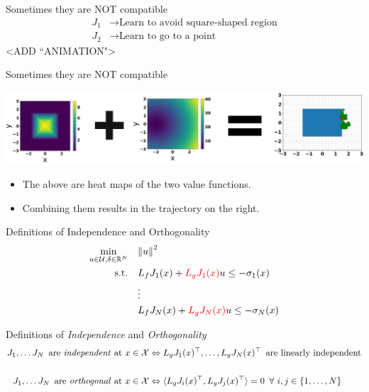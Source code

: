 \begin{frame}{Sometimes they are NOT compatible}
	\begin{align*}
		{J}_1 &\rightarrow \textrm{Learn to avoid square-shaped region} \\
		{J}_2 &\rightarrow \textrm{Learn to go to a point}
	\end{align*}
	<ADD ``ANIMATION">
\end{frame}

\begin{frame}{Sometimes they are NOT compatible}
	\begin{minipage}{\textwidth}
		\centering		
		\includegraphics[width=1.\linewidth]{diagramMath}
	\end{minipage}%
	\seprule
	\begin{itemize}
		\item{The above are heat maps of the two value functions.}
		\item{Combining them results in the trajectory on the right.}
	\end{itemize}
\end{frame}

\begin{frame}{Definitions of Independence and Orthogonality}
	\begin{align*}
		\min_{u \in \mathcal{U}, \delta \in \mathbb{R}^N} \quad & { \lVert u \rVert }^2 \\
		\textrm{s.t.} \quad & L_f {J}_1 (x) + { \color{red} L_g {J}_1 (x) } u \le - \sigma_1(x) \\
                \quad & \vdots \\
		\quad & L_f {J}_N (x) + { \color{red} L_g {J}_N (x) } u \le - \sigma_N(x) \\
	\end{align*}
\end{frame}

\begin{frame}{Definitions of \textit{Independence} and \textit{Orthogonality}}
	\centering
	\begin{align*}
		{J}_1, \ldots {J}_N \,\,\, \textrm{are \textit{independent} at $x \in \mathcal{X}$} &\Leftrightarrow L_g {J}_1 (x)^{\top}, \ldots, L_g {J}_N (x)^{\top} \,\,\, \textrm{are linearly independent}\\
		\\
		{J}_1, \ldots {J}_N \,\,\, \textrm{are \textit{orthogonal} at $x \in \mathcal{X}$} &\Leftrightarrow \langle L_g {J}_i (x)^{\top}, L_g {J}_j (x)^{\top} \rangle = 0 \,\,\, \forall \,\, i, j \in \{1,\ldots,N \}
	\end{align*}
\end{frame}

